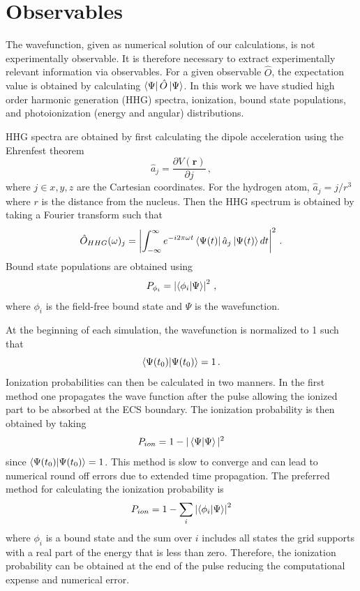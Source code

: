 \section{Observables} %
\label{sec:observables}

The wavefunction, given as numerical solution of our calculations, is not experimentally observable. It is therefore necessary to extract experimentally relevant information via observables. For a given observable $\hat{O}$, the expectation value is obtained by calculating $\bra{\Psi}\hat{O}\ket{\Psi}$. In this work we have studied high order harmonic generation (HHG) spectra, ionization, bound state populations, and photoionization (energy and angular) distributions.

HHG spectra are obtained by first calculating the dipole acceleration using the Ehrenfest theorem
\begin{equation}
  \hat{a}_j =  \frac{\partial V(\mathbf{r})}{\partial j}\, ,
\end{equation}
where $j \in x, y, z$ are the Cartesian coordinates. For the hydrogen atom, $\hat{a}_j=j/r^3$ where $r$ is the distance from the nucleus. Then the HHG spectrum is obtained by taking a Fourier transform such that
\begin{equation}
    \hat{O}_{HHG}(\omega)_j = \left| \int_{-\infty}^\infty e^{-i2\pi\omega t}\bra{\Psi(t)}\hat{a}_j\ket{\Psi(t)}dt\right|^2\, .
\end{equation}
Bound state populations are obtained using 
\begin{equation}
  P_{\phi_i} = \left|\bra{\phi_i}\ket{\Psi}\right|^2\, ,
\end{equation}
where $\phi_i$ is the field-free bound state and $\Psi$ is the wavefunction.

At the beginning of each simulation, the wavefunction is normalized to 1 such that
\begin{equation}
\bra{\Psi(t_0)}\ket{\Psi(t_0)} = 1\, .
\end{equation}
Ionization probabilities can then be calculated in two manners. In the first method one propagates the wave function after the pulse allowing the ionized part to be absorbed at the ECS boundary. The ionization probability is then obtained by taking 
\begin{equation}
  P_{ion}=1-|\bra{\Psi}\ket{\Psi}|^2
\end{equation}
since $\bra{\Psi(t_0)}\ket{\Psi(t_0)}=1$. This method is slow to converge and can lead to numerical round off errors due to extended time propagation. The preferred method for calculating the ionization probability is 
\begin{equation}
  P_{ion}=1-\sum\limits_i\left|\bra{\phi_i}\ket{\Psi}\right|^2
\end{equation}
where $\phi_i$ is a bound state and the sum over $i$ includes all states the grid supports with a real part of the energy that is less than zero. Therefore, the ionization probability can be obtained at the end of the pulse reducing the computational expense and numerical error.


